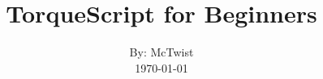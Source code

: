 

\def\writer{McTwist}

\title{TorqueScript for Beginners}
\author{By: \writer\\
	\today}



\maketitle

\newpage
\tableofcontents

\newpage
{}








